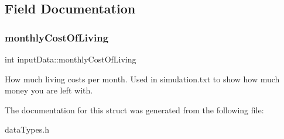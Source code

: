 \subsection{Field Documentation}
\mbox{\label{structinputData_aa119c01f0c52cfbae92e7b46c8af1df4}} 
\subsubsection{\texorpdfstring{monthlyCostOfLiving}{monthlyCostOfLiving}}
{\footnotesize\ttfamily int input\+Data\+::monthly\+Cost\+Of\+Living}

How much living costs per month. Used in simulation.\+txt to show how much money you are left with. 

The documentation for this struct was generated from the following file\+:\begin{DoxyCompactItemize}
\item 
data\+Types.\+h\end{DoxyCompactItemize}
